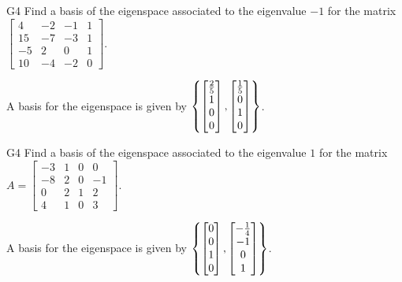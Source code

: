 \begin{problem}{G4}
Find a basis of the eigenspace associated to the eigenvalue \(-1\) for the matrix 
\(\begin{bmatrix} 4 & -2 & -1 & 1 \\ 15 & -7 & -3 & 1 \\ -5 & 2 & 0 & 1 \\ 10 & -4 & -2 & 0 \end{bmatrix}\). 
\end{problem}
\begin{solution}
A basis for the eigenspace is given by \(\left\{\begin{bmatrix} \frac{2}{5} \\1 \\  0\\0 \end{bmatrix},\begin{bmatrix} \frac{1}{5} \\ 0 \\ 1\\0 \end{bmatrix}\right\}\).
\end{solution}

\begin{problem}{G4}
Find a basis of the eigenspace associated to the eigenvalue \(1\) for the matrix 
\(A=\begin{bmatrix} -3 & 1 & 0 & 0 \\ -8 & 2 & 0 & -1 \\ 0 & 2 & 1 & 2 \\ 4 & 1 & 0 & 3 \end{bmatrix}\).
\end{problem}
\begin{solution}
A basis for the eigenspace is given by $\left\{\begin{bmatrix}0\\0\\1\\0\end{bmatrix},\begin{bmatrix} -\frac{1}{4} \\ -1 \\ 0\\1 \end{bmatrix}\right\}$.
\end{solution}


